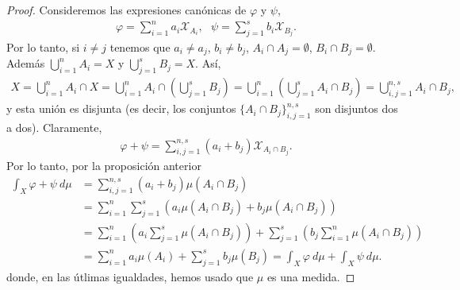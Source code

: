 \begin{proof}
    Consideremos las expresiones canónicas de $\varphi$ y $\psi$,
    \begin{align*}
        \varphi = \sum_{i=1}^{n}{a_i \mathcal{X}_{A_i}}, \ \ \ \psi = \sum_{j=1}^{s}{b_i \mathcal{X}_{B_j}}.
    \end{align*}
    Por lo tanto, si $i \not = j$ tenemos que $a_i \not = a_j$, $b_i \not = b_j$, $A_i \cap A_j = \emptyset$, $B_i \cap B_j = \emptyset$. Además $\bigcup_{i=1}^{n}{A_i} = X$ y $\bigcup_{j=1}^{s}{B_j} = X$. Así,
    \begin{align*}
        X = \bigcup_{i=1}^{n}{A_i \cap X} = \bigcup_{i=1}^{n}{A_i \cap \left( \bigcup_{j=1}^{s}{B_j} \right)} = \bigcup_{i=1}^{n}{ \left( \bigcup_{j=1}^{s}{A_i \cap B_j} \right)} = \bigcup_{i,j=1}^{n,s}{A_i \cap B_j},
    \end{align*}
    y esta unión es disjunta (es decir, los conjuntos $\{ A_i \cap B_j\}_{i,j=1}^{n,s}$ son disjuntos dos a dos). Claramente,
    \begin{align*}
        \varphi + \psi = \sum_{i,j=1}^{n,s}{(a_i + b_j)\mathcal{X}_{A_i \cap B_j}}.
    \end{align*}
    Por lo tanto, por la proposición anterior
    \begin{align*}
        \int_{X}{\varphi + \psi \ d\mu} & = \sum_{i,j = 1}^{n,s}{(a_i + b_j)\mu(A_i \cap B_j)}                                                                                          \\
                                        & = \sum_{i=1}^{n}{\sum_{j=1}^{s}{(a_i\mu(A_i \cap B_j) + b_j\mu(A_i \cap B_j))}}                                                               \\
                                        & =\sum_{i=1}^{n}{ \left( a_i \sum_{j=1}^{s}{\mu(A_i \cap B_j)} \right)} + \sum_{j=1}^{s}{ \left( b_j\sum_{i=1}^{n}{\mu(A_i \cap B_j)} \right)} \\
                                        & = \sum_{i=1}^{n}{a_i\mu(A_i)} + \sum_{j=1}^{s}{b_j\mu(B_j)} = \int_{X}{\varphi \ d\mu} + \int_{X}{\psi \ d\mu}.
    \end{align*}
    donde, en las útlimas igualdades, hemos usado que $\mu$ es una medida.
\end{proof}

